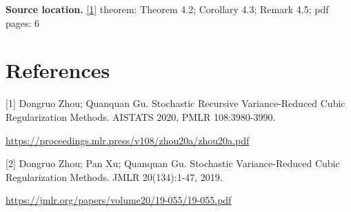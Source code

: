 \documentclass[10pt,a4paper]{article}
\begin{document}
\textbf{Source location.} \href{https://proceedings.mlr.press/v108/zhou20a/zhou20a.pdf}{[1]} theorem: Theorem 4.2; Corollary 4.3; Remark 4.5; pdf pages: 6

\section{References}
[1] Dongruo Zhou; Quanquan Gu. Stochastic Recursive Variance-Reduced Cubic Regularization Methods. AISTATS 2020, PMLR 108:3980-3990.

\url{https://proceedings.mlr.press/v108/zhou20a/zhou20a.pdf}

[2] Dongruo Zhou; Pan Xu; Quanquan Gu. Stochastic Variance-Reduced Cubic Regularization Methods. JMLR 20(134):1-47, 2019.

\url{https://jmlr.org/papers/volume20/19-055/19-055.pdf}
\end{document}
